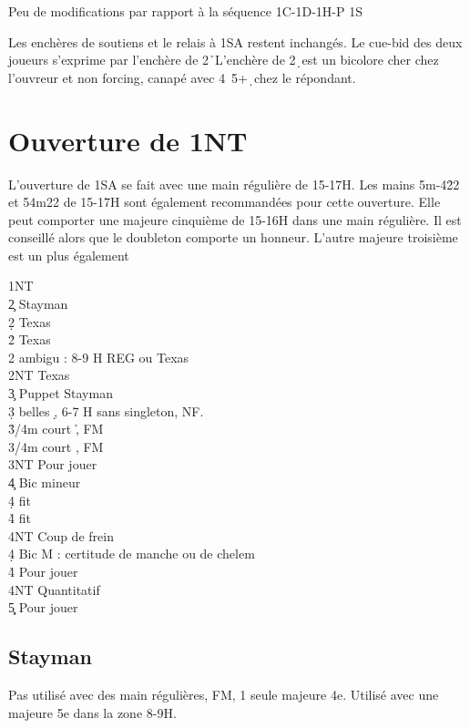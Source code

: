 \documentclass[a4paper]{article}
\begin{document}
Peu de modifications par rapport à la séquence
1C-1D-1H-P
1S

Les enchères de soutiens et le relais à 1SA restent inchangés.
Le cue-bid des deux joueurs s’exprime par l’enchère de 2\h\ 
L’enchère de 2\d\ est un bicolore cher chez l’ouvreur et non forcing, canapé avec 4\s\ 5+\d\ chez le 
répondant.

\section{Ouverture de 1NT}

L’ouverture de 1SA se fait avec une main régulière de 15-17H. 
Les mains 5m-4\h 22 et 54m22 de 15-17H sont également recommandées pour cette 
ouverture.
Elle peut comporter une majeure cinquième de 15-16H dans une main régulière. Il est 
conseillé alors que le doubleton comporte un honneur. L’autre majeure troisième est un plus 
également

\begin{bidtable}
1NT\+\\
2\c \> Stayman\\
2\d \> Texas \h \\
2\h \> Texas \s \\
2\s \> ambigu : 8-9 H REG ou Texas \c \\
2NT \> Texas \d \\
3\c \> Puppet Stayman\\
3\d {} belles \d , 6-7 H sans singleton, NF.\\
3\h {}/4m court \h , FM\\
3\s \> 5/4m court \s , FM\\
3NT \> Pour jouer\\
4\c \> Bic mineur\+\\
4\d \> fit \d \\
4\h\s \> fit \c \\
4NT \> Coup de frein\-\\
4\d \> Bic M : certitude de manche ou de chelem\\
4\h\s \> Pour jouer\\
4NT \> Quantitatif\\
5\c\d \> Pour jouer\-
\end{bidtable}

\subsection{Stayman}

Pas utilisé avec des main régulières, FM, 1 seule majeure 4e.
Utilisé avec une majeure 5e dans la zone 8-9H.
\end{document}
